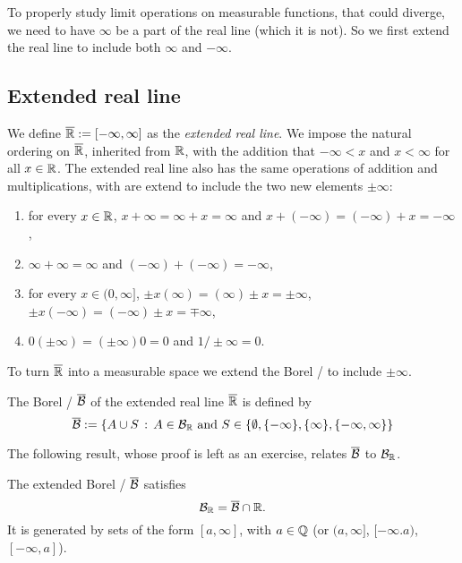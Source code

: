 To properly study limit operations on measurable functions, that could diverge, we need to have $\infty$ be a part of the real line (which it is not). So we first extend the real line to include both $\infty$ and $-\infty$.

\subsection{Extended real line}

We define $\overline{\mathbb R} := [-\infty, \infty]$ as the \emph{extended real line}. We impose the natural ordering on $\overline{\mathbb R}$, inherited from $\mathbb R$, with the addition that $-\infty < x$ and $x < \infty$ for all $x \in \mathbb R$. The extended real line also has the same operations of addition and multiplications, with are extend to include the two new elements $\pm \infty$:
\begin{enumerate}
\item for every $x\in \mathbb R$, $x + \infty = \infty + x = \infty$ and $x + (-\infty) = (-\infty) + x = -\infty$,
\item $\infty + \infty = \infty$ and $(-\infty) + (-\infty) = -\infty$,
\item for every $x \in (0,\infty]$, $\pm x (\infty) = (\infty) \pm x = \pm \infty$, $\pm x (-\infty) = (-\infty) \pm x = \mp \infty$,
\item $0 (\pm \infty) = (\pm \infty) 0 = 0$ and $1/\pm \infty = 0$.
\end{enumerate}
To turn $\overline{\mathbb R}$ into a measurable space we extend the Borel \sigalg/ to include $\pm \infty$.

\begin{definition}
The Borel \sigalg/ $\overline{\mathcal B}$ of the extended real line $\overline{\mathbb R}$ is defined by
\[
	\overline{\mathcal B} := \{A \cup S \, :\, A \in \mathcal B_{\mathbb R} \text{ and } S \in \{\emptyset, \{-\infty\}, \{\infty\}, \{-\infty, \infty\}\}
\]
\end{definition}

The following result, whose proof is left as an exercise, relates $\overline{\mathcal B}$ to $\mathcal B_{\mathbb R}$.

\begin{lemma}\label{lem:characterization_extended_borel}
The extended Borel \sigalg/ $\overline{\mathcal B}$ satisfies
\[
	\mathcal B_{\mathbb R} = \overline{\mathcal B} \cap \mathbb R.
\]
It is generated by sets of the form $[a,\infty]$, with $a \in \mathbb Q$ (or $(a,\infty]$, $[-\infty.a)$, $[-\infty,a]$).
\end{lemma}

